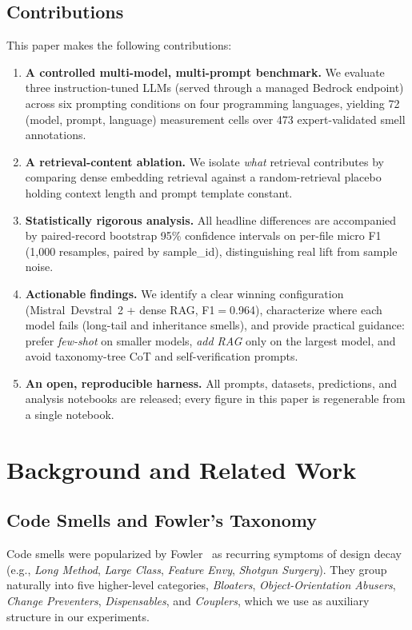 \documentclass[conference]{IEEEtran}
\begin{document}
\subsection{Contributions}
This paper makes the following contributions:
\begin{enumerate}
 \item \textbf{A controlled multi-model, multi-prompt benchmark.} We evaluate
 three instruction-tuned LLMs (served through a managed Bedrock endpoint)
 across six prompting conditions on four programming languages, yielding
 72 (model, prompt, language) measurement cells over 473 expert-validated
 smell annotations.
 \item \textbf{A retrieval-content ablation.} We isolate \emph{what} retrieval
 contributes by comparing dense embedding retrieval against a random-retrieval
 placebo holding context length and prompt template constant.
 \item \textbf{Statistically rigorous analysis.} All headline differences are
 accompanied by paired-record bootstrap 95\% confidence intervals on per-file
 micro F1 (1{,}000 resamples, paired by sample\_id), distinguishing real lift
 from sample noise.
 \item \textbf{Actionable findings.} We identify a clear winning configuration
 (Mistral~Devstral~2 + dense RAG, F1$=$0.964), characterize where each model
 fails (long-tail and inheritance smells), and provide practical guidance:
 prefer \emph{few-shot} on smaller models, \emph{add RAG} only on the largest
 model, and avoid taxonomy-tree CoT and self-verification prompts.
 \item \textbf{An open, reproducible harness.} All prompts, datasets,
 predictions, and analysis notebooks are released; every figure in this paper
 is regenerable from a single notebook.
\end{enumerate}

\section{Background and Related Work}

\subsection{Code Smells and Fowler's Taxonomy}
Code smells were popularized by Fowler~\cite{fowler2018refactoring} as recurring symptoms of design decay
(e.g., \textit{Long Method}, \textit{Large Class}, \textit{Feature Envy},
\textit{Shotgun Surgery}). They group naturally
into five higher-level categories, \textit{Bloaters},
\textit{Object-Orientation Abusers}, \textit{Change Preventers},
\textit{Dispensables}, and \textit{Couplers}, which we use as auxiliary structure
in our experiments.
\end{document}
